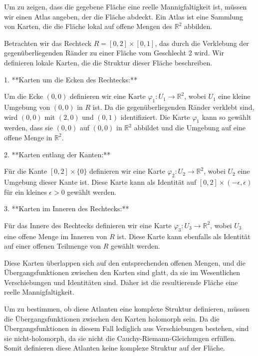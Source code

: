 Um zu zeigen, dass die gegebene Fläche eine reelle Mannigfaltigkeit ist, müssen wir einen Atlas angeben, der die Fläche abdeckt. Ein Atlas ist eine Sammlung von Karten, die die Fläche lokal auf offene Mengen des $\mathbb{R}^2$ abbilden. 

Betrachten wir das Rechteck $R = [0, 2] \times [0, 1]$, das durch die Verklebung der gegenüberliegenden Ränder zu einer Fläche vom Geschlecht 2 wird. Wir definieren lokale Karten, die die Struktur dieser Fläche beschreiben.

1. **Karten um die Ecken des Rechtecks:**

   Um die Ecke $(0,0)$ definieren wir eine Karte $\varphi_1: U_1 \to \mathbb{R}^2$, wobei $U_1$ eine kleine Umgebung von $(0,0)$ in $R$ ist. Da die gegenüberliegenden Ränder verklebt sind, wird $(0,0)$ mit $(2,0)$ und $(0,1)$ identifiziert. Die Karte $\varphi_1$ kann so gewählt werden, dass sie $(0,0)$ auf $(0,0)$ in $\mathbb{R}^2$ abbildet und die Umgebung auf eine offene Menge in $\mathbb{R}^2$.

2. **Karten entlang der Kanten:**

   Für die Kante $[0,2] \times \{0\}$ definieren wir eine Karte $\varphi_2: U_2 \to \mathbb{R}^2$, wobei $U_2$ eine Umgebung dieser Kante ist. Diese Karte kann als Identität auf $[0,2] \times (-\epsilon, \epsilon)$ für ein kleines $\epsilon > 0$ gewählt werden.

3. **Karten im Inneren des Rechtecks:**

   Für das Innere des Rechtecks definieren wir eine Karte $\varphi_3: U_3 \to \mathbb{R}^2$, wobei $U_3$ eine offene Menge im Inneren von $R$ ist. Diese Karte kann ebenfalls als Identität auf einer offenen Teilmenge von $R$ gewählt werden.

Diese Karten überlappen sich auf den entsprechenden offenen Mengen, und die Übergangsfunktionen zwischen den Karten sind glatt, da sie im Wesentlichen Verschiebungen und Identitäten sind. Daher ist die resultierende Fläche eine reelle Mannigfaltigkeit.

Um zu bestimmen, ob diese Atlanten eine komplexe Struktur definieren, müssen die Übergangsfunktionen zwischen den Karten holomorph sein. Da die Übergangsfunktionen in diesem Fall lediglich aus Verschiebungen bestehen, sind sie nicht-holomorph, da sie nicht die Cauchy-Riemann-Gleichungen erfüllen. Somit definieren diese Atlanten keine komplexe Struktur auf der Fläche.